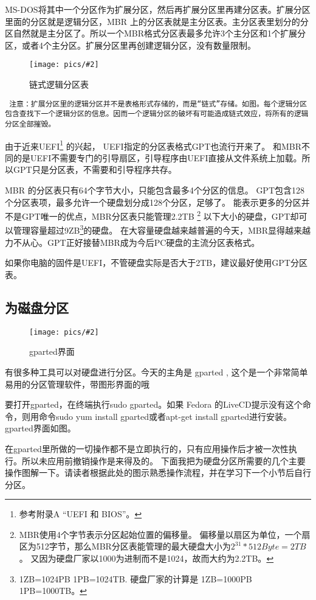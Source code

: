 \documentclass[amstex]{ctexbook}
\newenvironment{notice}{\tt}{}
\newcommand{\chatu}[3][0.35]{%
\begin{figure}[h]%
\centering%
\texttt{[image: pics/\#2]}%
\caption{#3\label{fig:#2}}%
\end{figure}%
}
\begin{document}
MS-DOS将其中一个分区作为扩展分区，然后再扩展分区里再建分区表。扩展分区里面的分区就是逻辑分区，MBR 上的分区表就是主分区表。主分区表里划分的分区自然就是主分区了。所以一个MBR格式分区表最多允许3个主分区和1个扩展分区，或者4个主分区。扩展分区里再创建逻辑分区，没有数量限制。
\chatu{logicalpart}{链式逻辑分区表}

\begin{notice}
注意：扩展分区里的逻辑分区并不是表格形式存储的，而是“链式”存储。如图。每个逻辑分区包含查找下一个逻辑分区的信息。因而一个逻辑分区的破坏有可能造成链式效应，将所有的逻辑分区全部摧毁。
\end{notice}

由于近来UEFI\footnote{参考附录A “UEFI 和 BIOS”。}  的兴起，
UEFI指定的分区表格式GPT也流行开来了。
和MBR不同的是UEFI不需要专门的引导扇区，引导程序由UEFI直接从文件系统上加载。所以GPT只是分区表，不需要和引导程序共存。

MBR 的分区表只有64个字节大小，只能包含最多4个分区的信息。
GPT包含128个分区表项，最多允许一个硬盘划分成128个分区，足够了。
能表示更多的分区并不是GPT唯一的优点，MBR分区表只能管理2.2TB
\footnote{MBR使用4个字节表示分区起始位置的偏移量。
偏移量以扇区为单位，一个扇区为512字节，那么MBR分区表能管理的最大硬盘大小为$2^{31}*512Byte = 2TB$。
又因为硬盘厂家以1000为进制而不是1024，故而大约为2.2TB。}%
以下大小的硬盘，GPT却可以管理容量超过9ZB\footnote{1ZB=1024PB 1PB=1024TB. 硬盘厂家的计算是 1ZB=1000PB 1PB=1000TB。}的硬盘。
在大容量硬盘越来越普遍的今天，MBR显得越来越力不从心。GPT正好接替MBR成为今后PC硬盘的主流分区表格式。

如果你电脑的固件是UEFI，不管硬盘实际是否大于2TB，建议最好使用GPT分区表。

\subsection{为磁盘分区}

\chatu{gparted-gui}{gparted界面}

\FloatBarrier

\normalfont

有很多种工具可以对硬盘进行分区。今天的主角是 gparted , 这个是一个非常简单易用的分区管理软件，带图形界面的哦~~

要打开gparted，在终端执行sudo gparted。如果 Fedora 的LiveCD提示没有这个命令，则用命令sudo yum install gparted或者apt-get install gparted进行安装。gparted界面如图。

在gparted里所做的一切操作都不是立即执行的，只有应用操作后才被一次性执行。所以未应用前撤销操作是来得及的。
下面我把为硬盘分区所需要的几个主要操作图解一下。请读者根据此处的图示熟悉操作流程，并在学习下一个小节后自行分区。
\end{document}
